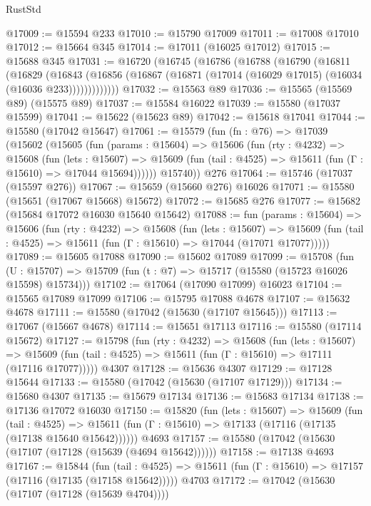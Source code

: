 \begin{lexlean}{RustStd}
\begin{coremodule}
@17009 := @15594 @233
@17010 := @15790 @17009
@17011 := @17008 @17010
@17012 := @15664 @345
@17014 := @17011 (@16025 @17012)
@17015 := @15688 @345
@17031 := @16720
    (@16745
      (@16786
        (@16788
          (@16790
            (@16811
              (@16829
                (@16843
                  (@16856 (@16867 (@16871 (@17014 (@16029 @17015) (@16034 (@16036 @233)))))))))))))
@17032 := @15563 @89
@17036 := @15565 (@15569 @89) (@15575 @89)
@17037 := @15584 @16022
@17039 := @15580 (@17037 @15599)
@17041 := @15622 (@15623 @89)
@17042 := @15618 @17041
@17044 := @15580 (@17042 @15647)
@17061 := @15579
    (fun (fn : @76) =>
    @17039
      (@15602
        (@15605
          (fun (params : @15604) =>
          @15606
            (fun (rty : @4232) =>
            @15608
              (fun (lets : @15607) =>
              @15609 (fun (tail : @4525) => @15611 (fun (Γ : @15610) => @17044 @15694))))))
        @15740))
    @276
@17064 := @15746 (@17037 (@15597 @276))
@17067 := @15659 (@15660 @276) @16026
@17071 := @15580 (@15651 (@17067 @15668) @15672)
@17072 := @15685 @276
@17077 := @15682 (@15684 @17072 @16030 @15640 @15642)
@17088 := fun (params : @15604) =>
  @15606
    (fun (rty : @4232) =>
    @15608
      (fun (lets : @15607) =>
      @15609 (fun (tail : @4525) => @15611 (fun (Γ : @15610) => @17044 (@17071 @17077)))))
@17089 := @15605 @17088
@17090 := @15602 @17089
@17099 := @15708
    (fun (U : @15707) => @15709 (fun (t : @7) => @15717 (@15580 (@15723 @16026 @15598) @15734)))
@17102 := @17064 (@17090 @17099) @16023
@17104 := @15565 @17089 @17099
@17106 := @15795 @17088 @4678
@17107 := @15632 @4678
@17111 := @15580 (@17042 (@15630 (@17107 @15645)))
@17113 := @17067 (@15667 @4678)
@17114 := @15651 @17113
@17116 := @15580 (@17114 @15672)
@17127 := @15798
    (fun (rty : @4232) =>
    @15608
      (fun (lets : @15607) =>
      @15609 (fun (tail : @4525) => @15611 (fun (Γ : @15610) => @17111 (@17116 @17077)))))
    @4307
@17128 := @15636 @4307
@17129 := @17128 @15644
@17133 := @15580 (@17042 (@15630 (@17107 @17129)))
@17134 := @15680 @4307
@17135 := @15679 @17134
@17136 := @15683 @17134
@17138 := @17136 @17072 @16030
@17150 := @15820
    (fun (lets : @15607) =>
    @15609
      (fun (tail : @4525) =>
      @15611 (fun (Γ : @15610) => @17133 (@17116 (@17135 (@17138 @15640 @15642))))))
    @4693
@17157 := @15580 (@17042 (@15630 (@17107 (@17128 (@15639 (@4694 @15642))))))
@17158 := @17138 @4693
@17167 := @15844
    (fun (tail : @4525) => @15611 (fun (Γ : @15610) => @17157 (@17116 (@17135 (@17158 @15642)))))
    @4703
@17172 := @17042 (@15630 (@17107 (@17128 (@15639 @4704))))

\end{coremodule}
\end{lexlean}
